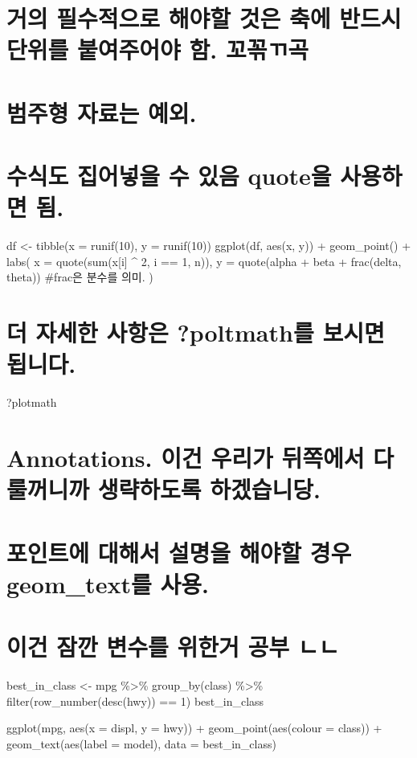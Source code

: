 \documentclass[]{article}
\begin{document}
\section{거의 필수적으로 해야할 것은 축에 반드시 단위를 붙여주어야 함.
꼬꼮ㄲ곡}\label{--------.-}

\section{범주형 자료는 예외.}\label{--.}

\section{수식도 집어넣을 수 있음 quote을 사용하면
됨.}\label{----quote--.}

df \textless{}- tibble(x = runif(10), y = runif(10)) ggplot(df, aes(x,
y)) + geom\_point() + labs( x = quote(sum(x{[}i{]} \^{} 2, i == 1, n)),
y = quote(alpha + beta + frac(delta, theta)) \#frac은 분수를 의미. )

\section{더 자세한 사항은 ?poltmath를 보시면
됩니다.}\label{---poltmath--.}

?plotmath

\section{Annotations. 이건 우리가 뒤쪽에서 다룰꺼니까 생략하도록
하겠습니당.}\label{annotations.------.}

\section{포인트에 대해서 설명을 해야할 경우 geom\_text를
사용.}\label{-----geom_text-.}

\section{이건 잠깐 변수를 위한거 공부 ㄴㄴ}\label{-----}

best\_in\_class \textless{}- mpg \%\textgreater{}\% group\_by(class)
\%\textgreater{}\% filter(row\_number(desc(hwy)) == 1) best\_in\_class

ggplot(mpg, aes(x = displ, y = hwy)) + geom\_point(aes(colour = class))
+ geom\_text(aes(label = model), data = best\_in\_class)
\end{document}
